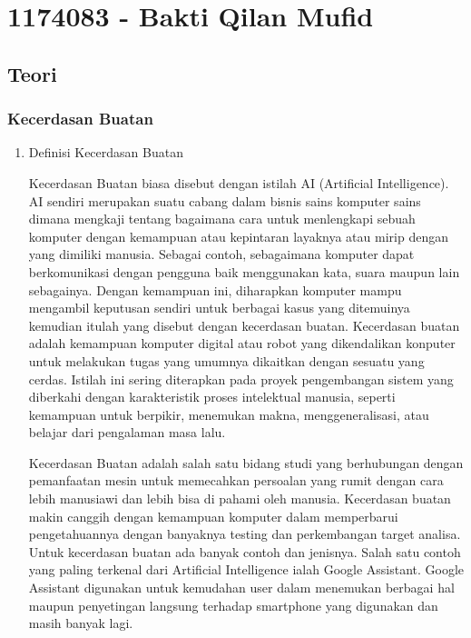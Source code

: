 \section{1174083 - Bakti Qilan Mufid}
\subsection{Teori}
\subsubsection{Kecerdasan Buatan}
\begin{enumerate}
    \item {Definisi Kecerdasan Buatan}
    \par Kecerdasan Buatan biasa disebut dengan istilah AI (Artificial Intelligence). AI sendiri merupakan suatu cabang dalam bisnis sains komputer sains dimana mengkaji tentang bagaimana cara untuk menlengkapi sebuah komputer dengan kemampuan atau kepintaran layaknya atau mirip dengan yang dimiliki manusia. Sebagai contoh, sebagaimana komputer dapat berkomunikasi dengan pengguna baik menggunakan kata, suara maupun lain sebagainya. Dengan kemampuan ini, diharapkan komputer mampu mengambil keputusan sendiri untuk berbagai kasus yang ditemuinya kemudian itulah yang disebut dengan kecerdasan buatan. Kecerdasan buatan adalah kemampuan komputer digital atau robot yang dikendalikan konputer untuk melakukan tugas yang umumnya dikaitkan dengan sesuatu yang cerdas. Istilah ini sering diterapkan pada proyek pengembangan sistem yang diberkahi dengan karakteristik proses intelektual manusia, seperti kemampuan untuk berpikir, menemukan makna, menggeneralisasi, atau belajar dari pengalaman masa lalu.

    Kecerdasan Buatan adalah salah satu bidang studi yang berhubungan dengan pemanfaatan mesin untuk memecahkan persoalan yang rumit dengan cara lebih manusiawi dan lebih bisa di pahami oleh manusia. Kecerdasan buatan makin canggih dengan kemampuan komputer dalam memperbarui pengetahuannya dengan banyaknya testing dan perkembangan target analisa. Untuk kecerdasan buatan ada banyak contoh dan jenisnya. Salah satu contoh yang paling terkenal dari Artificial Intelligence ialah Google Assistant. Google Assistant digunakan untuk kemudahan user dalam menemukan berbagai hal maupun penyetingan langsung terhadap smartphone yang digunakan dan masih banyak lagi.
    

\end{enumerate}
